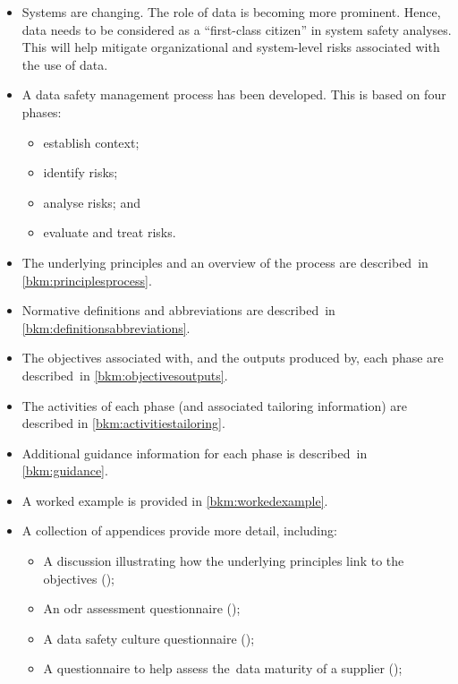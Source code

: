 \begin{itemize}
  \item Systems are changing. The role of data is becoming more prominent. Hence, data needs to be considered as a ``first-class citizen'' in system safety analyses. This will help mitigate organizational and system-level risks associated with the use of data.

  \item A data safety management process has been developed. This is based on four phases:
    \begin{itemize}
      \item establish context;
      \item identify risks;
      \item analyse risks; and
      \item evaluate and \gls{treat} risks.
    \end{itemize}
	\item The underlying principles and an overview of the process \cbstart are described\cbend\ in \autoref{bkm:principlesprocess}.
	\item \cbstart Normative definitions and abbreviations are described\cbend\ in \autoref{bkm:definitionsabbreviations}.
	\item The objectives associated with, and the outputs produced by, each phase are \cbstart described\cbend\ in \autoref{bkm:objectivesoutputs}.
	\item The activities of each phase (and associated \gls{tailoring} \gls{information}) are described in \autoref{bkm:activitiestailoring}.
	\item Additional guidance \gls{information} for each phase is \cbstart described\cbend\ in \autoref{bkm:guidance}.
  \item A worked example is provided in \autoref{bkm:workedexample}.
  \item A collection of appendices provide more detail, including:
    \begin{itemize}
      \item A discussion illustrating how the underlying principles link to the objectives (); 
      \item An \gls{odr} assessment questionnaire ();
      \item A data safety culture questionnaire ();
      \item A questionnaire to help assess \cbstart the\cbend\ data maturity of a supplier ();

\end{itemize}
\end{itemize}
